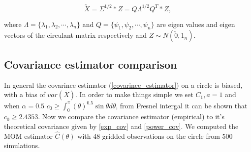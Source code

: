 % 
% 


\[
	\utilde{X} = \Sigma^{1/2}*Z = Q\Lambda^{1/2}Q^T*Z,  
\]

where  $\Lambda=\{\lambda_1, \lambda_2,\cdots,\lambda_n\}$ and $Q=\{\psi_1, \psi_2,\cdots,\psi_n\}$ are eigen values and eigen vectors of the circulant matrix respectively and $Z\sim N(\utilde{0},1_{n})$.

\subsection{Covariance estimator comparison} 


	      In general the covarince estimator (\ref{covarince_estimator}) on a circle is biased, with a bias of $var(\bar{X})$. In order to make things simple we set $C_1, a = 1$ and when $\alpha = 0.5$ $c_0 \ge \int_0^\pi(\theta)^{0.5} \sin \theta d \theta$, from Fresnel intergal it can be shown that $c_0 \ge 2.4353$. Now we compare the covariance estimator (empirical) to it's theoretical covariance given by \ref{exp_cov} and \ref{power_cov}. We computed the MOM estimator $\hat{C}(\theta)$ with 48 gridded observations on the circle from 500 simulations.
	      	      
